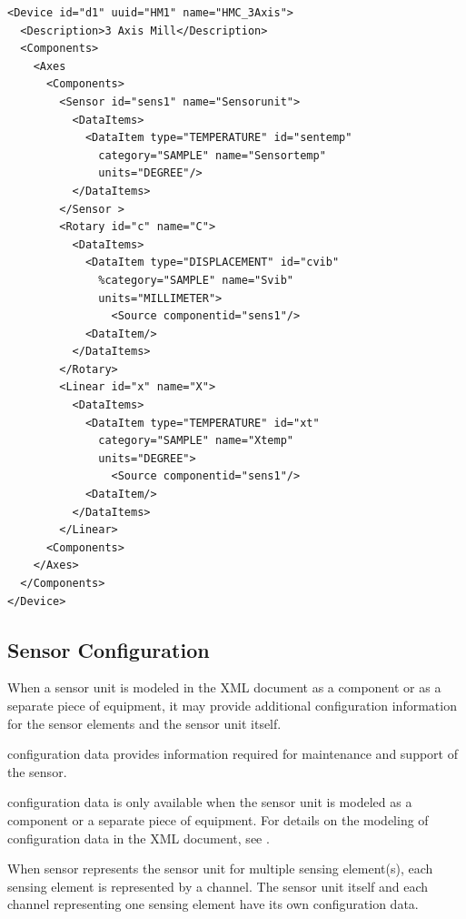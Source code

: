 \documentclass{mtconnect}	%
\begin{document}
\begin{lstlisting}[firstnumber=1,escapechar=|,%
    caption={Example of Sensor Unit with Sensing Element}, label={lst:example-of-sensor-with-sensing-elements}]
<Device id="d1" uuid="HM1" name="HMC_3Axis">
  <Description>3 Axis Mill</Description>
  <Components>
    <Axes
      <Components>
        <Sensor id="sens1" name="Sensorunit">
          <DataItems>
            <DataItem type="TEMPERATURE" id="sentemp"
              category="SAMPLE" name="Sensortemp" 
              units="DEGREE"/> 
          </DataItems>
        </Sensor >
        <Rotary id="c" name="C">
          <DataItems>
            <DataItem type="DISPLACEMENT" id="cvib"
              %category="SAMPLE" name="Svib" 
              units="MILLIMETER">
                <Source componentid="sens1"/>
            <DataItem/>
          </DataItems>
        </Rotary>
        <Linear id="x" name="X">
          <DataItems>
            <DataItem type="TEMPERATURE" id="xt" 
              category="SAMPLE" name="Xtemp" 
              units="DEGREE">
                <Source componentid="sens1"/>
            <DataItem/>
          </DataItems>
        </Linear>
      <Components>
    </Axes>
  </Components>
</Device>
\end{lstlisting}

\subsection{Sensor Configuration}
\label{sec:Sensor Configuration}

When a \gls{sensor} unit is modeled in the XML document as a \gls{component} or as a separate piece of equipment, it may provide additional configuration information for the \glspl{sensor element} and the \gls{sensor unit} itself.  

\gls{configuration} data provides information required for maintenance and support of the sensor.

\gls{configuration} data is only available when the \gls{sensor} unit is modeled as a \gls{component} or a separate piece of equipment. For details on the modeling of configuration data in the XML document, see .

When \gls{sensor} represents the \gls{sensor unit} for multiple \gls{sensing element}(s), each sensing element is represented by a \gls{channel}.   The \gls{sensor unit} itself and each \gls{channel} representing one \gls{sensing element} \may have its own configuration data.
\end{document}
